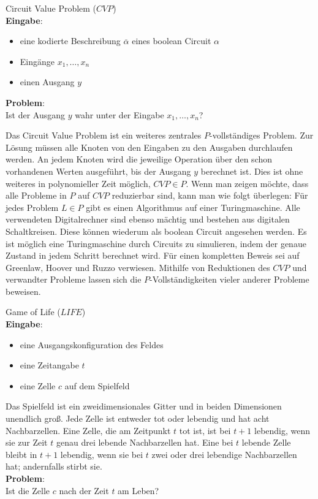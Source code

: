 \begin{problem}
    Circuit Value Problem ($CVP$) \\
    \textbf{Eingabe}:
    \begin{itemize}
        \item eine kodierte Beschreibung $\overline{\alpha}$ eines
            boolean Circuit $\alpha$
        \item Eingänge $x_1, \ldots, x_n$
        \item einen Ausgang $y$
    \end{itemize}
    \textbf{Problem}: \\
    Ist der Ausgang $y$ wahr unter der Eingabe $x_1, \ldots, x_n$?
\end{problem}

Das Circuit Value Problem ist ein weiteres zentrales $P$-vollständiges Problem.
Zur Lösung müssen alle Knoten von den Eingaben zu den Ausgaben durchlaufen
werden.
An jedem Knoten wird die jeweilige Operation über den schon vorhandenen Werten
ausgeführt, bis der Ausgang $y$ berechnet ist.
Dies ist ohne weiteres in polynomieller Zeit möglich, $CVP \in P$.
Wenn man zeigen möchte, dass alle Probleme in $P$ auf $CVP$ reduzierbar sind,
kann man wie folgt überlegen:
Für jedes Problem $L \in P$ gibt es einen Algorithmus auf einer Turingmaschine.
Alle verwendeten Digitalrechner sind ebenso mächtig und bestehen aus digitalen
Schaltkreisen.
Diese können wiederum als boolean Circuit angesehen werden.
Es ist möglich eine Turingmaschine durch Circuits zu simulieren, indem der
genaue Zustand in jedem Schritt berechnet wird. \cite[S.59f,71f]{greenlaw}
Für einen kompletten Beweis sei auf Greenlaw, Hoover und Ruzzo
\cite[Kapitel 6]{greenlaw} verwiesen.
Mithilfe von Reduktionen des $CVP$ und verwandter Probleme lassen sich die
$P$-Vollständigkeiten vieler anderer Probleme beweisen.

\begin{problem}
    Game of Life ($LIFE$) \\
    \textbf{Eingabe}:
    \begin{itemize}
        \item eine Ausgangskonfiguration des Feldes
        \item eine Zeitangabe $t$
        \item eine Zelle $c$ auf dem Spielfeld
    \end{itemize}
    Das Spielfeld ist ein zweidimensionales Gitter und in beiden Dimensionen
    unendlich groß.
    Jede Zelle ist entweder tot oder lebendig und hat acht Nachbarzellen.
    Eine Zelle, die am Zeitpunkt $t$ tot ist, ist bei $t+1$ lebendig,
    wenn sie zur Zeit $t$ genau drei lebende Nachbarzellen hat.
    Eine bei $t$ lebende Zelle bleibt in $t+1$ lebendig, wenn sie bei $t$ zwei
    oder drei lebendige Nachbarzellen hat; andernfalls stirbt sie. \\
    \textbf{Problem}: \\
    Ist die Zelle $c$ nach der Zeit $t$ am Leben?
    \cite[S.211]{greenlaw}
\end{problem}

